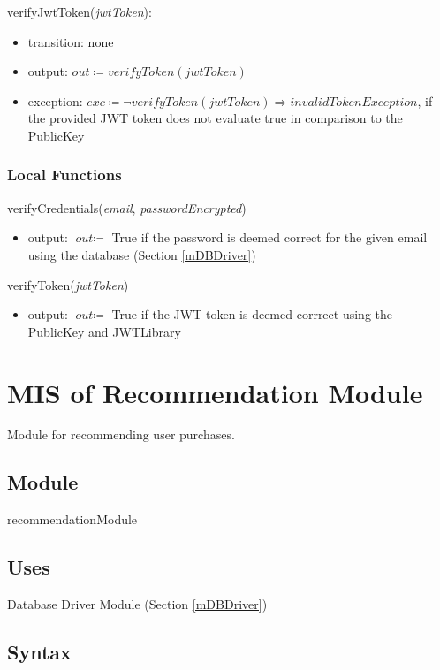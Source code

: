 \documentclass[12pt, titlepage]{article}
\begin{document}
\noindent verifyJwtToken(\textit{jwtToken}):
\begin{itemize}
\item transition: none
\item output: \( \textit{out} \coloneqq verifyToken(\textit{jwtToken})\)
\item exception: \( \textit{exc} \coloneqq \neg verifyToken(\textit{jwtToken}) \Rightarrow invalidTokenException \), if the provided JWT token does not evaluate true in comparison to the PublicKey
\end{itemize}

\subsubsection{Local Functions}
verifyCredentials(\textit{email}, \textit{passwordEncrypted})
\begin{itemize}
\item output: \( \textit{out} \coloneqq \) True if the password is deemed correct for the given email using the database (Section \ref{mDBDriver})
\end{itemize}

\noindent verifyToken(\textit{jwtToken})
\begin{itemize}
\item output: \( \textit{out} \coloneqq \) True if the JWT token is deemed corrrect using the PublicKey and JWTLibrary
\end{itemize}

\newpage

\section{MIS of Recommendation Module} \label{mRecommendation}

Module for recommending user purchases.

\subsection{Module}

recommendationModule

\subsection{Uses}

Database Driver Module (Section \ref{mDBDriver})

\subsection{Syntax}
\end{document}

